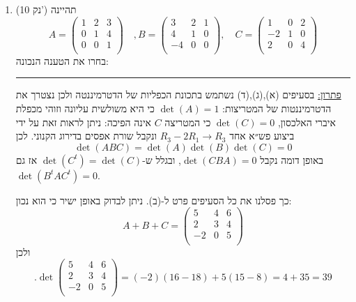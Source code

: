 \documentclass[12pt, a4paper]{article}
\newcommand{\points}[1]{(#1 נק') }
\begin{document}
\begin{enumerate}
\item\points{10}
תהיינה
$$A=\begin{pmatrix}
1&2&3\\
0&1&4\\
0&0&1\\
\end{pmatrix}\quad,
B=
\begin{pmatrix}
3&2&1\\
4&1&0\\
-4&0&0\\
\end{pmatrix},\quad
C=
\begin{pmatrix}
1&0&2\\
-2&1&0\\
2&0&4\\
\end{pmatrix}$$
בחרו את הטענה הנכונה:
\begin{enumerate}
\end{enumerate}

\noindent\rule{16cm}{0.4pt}

\underline{פתרון:}
בסעיפים (א),(ג),(ד) נשתמש בתכונת הכפליות של הדטרמיננטה ולכן נצטרך את הדטרמיננטות של המטריצות:
$\det(A)=1$
כי היא משולשית עליונה וזוהי מכפלת איברי האלכסון,
$\det(C)=0$
כי המטריצה
$C$
אינה הפיכה: ניתן לראות זאת על ידי ביצוע פש״א אחד
$R_3-2R_1\rightarrow R_3$
ונקבל שורת אפסים בדירוג הקנוני.
לכן
$$\det(ABC)=\det(A)\det(B)\det(C)=0$$
באופן דומה נקבל
$\det(CBA)=0$,
ובגלל ש-$\det(C^t)=\det(C)$
אז גם
$\det(B^tAC^t)=0$.

כך פסלנו את כל הסעיפים פרט ל-(ב). ניתן לבדוק באופן ישיר כי הוא נכון:
$$A+B+C=
\begin{pmatrix}
5&4&6\\
2&3&4\\
-2&0&5\\
\end{pmatrix}$$
ולכן
$$.\det
\begin{pmatrix}
5&4&6\\
2&3&4\\
-2&0&5\\
\end{pmatrix}
=
(-2)(16-18)+5(15-8)=4+35=39$$


\end{enumerate}
\end{document}
